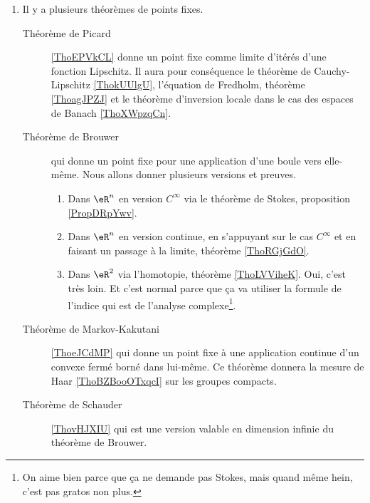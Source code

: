     \begin{enumerate}
\item 
    Il y a plusieurs théorèmes de points fixes.
    \begin{description}
        \item[Théorème de Picard] \ref{ThoEPVkCL} donne un point fixe comme limite d'itérés d'une fonction Lipschitz. Il aura pour conséquence le théorème de Cauchy-Lipschitz \ref{ThokUUlgU}, l'équation de Fredholm, théorème \ref{ThoagJPZJ} et le théorème d'inversion locale dans le cas des espaces de Banach \ref{ThoXWpzqCn}.
    \item[Théorème de Brouwer] qui donne un point fixe pour une application d'une boule vers elle-même. Nous allons donner plusieurs versions et preuves.
            \begin{enumerate}
                \item
                    Dans \( \eR^n\) en version \( C^{\infty}\) via le théorème de Stokes, proposition \ref{PropDRpYwv}.
                \item
                    Dans \( \eR^n\) en version continue, en s'appuyant sur le cas \( C^{\infty}\) et en faisant un passage à la limite, théorème \ref{ThoRGjGdO}.
                \item
                    Dans \( \eR^2\) via l'homotopie, théorème \ref{ThoLVViheK}. Oui, c'est très loin. Et c'est normal parce que ça va utiliser la formule de l'indice qui est de l'analyse complexe\footnote{On aime bien parce que ça ne demande pas Stokes, mais quand même hein, c'est pas gratos non plus.}.
            \end{enumerate}
        \item[Théorème de Markov-Kakutani]\ref{ThoeJCdMP} qui donne un point fixe à une application continue d'un convexe fermé borné dans lui-même. Ce théorème donnera la mesure de Haar \ref{ThoBZBooOTxqcI} sur les groupes compacts.
        \item[Théorème de Schauder] \ref{ThovHJXIU} qui est une version valable en dimension infinie du théorème de Brouwer. 
    \end{description}


\end{enumerate}
